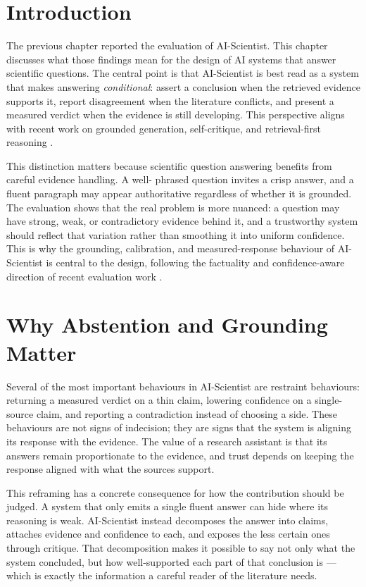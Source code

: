 \section{Introduction }

The previous chapter reported the evaluation of AI-Scientist. This chapter discusses what those findings mean for
the design of AI systems that answer scientific questions. The central point is that AI-Scientist is best read as a
system that makes answering \emph{conditional}: assert a conclusion when the retrieved evidence supports it, report
disagreement when the literature conflicts, and present a measured verdict when the evidence is still developing.
This perspective aligns with recent work on grounded generation, self-critique, and retrieval-first reasoning
\cite{lewis2020rag,shinn2023reflexion,asai2024selfrag}.

This distinction matters because scientific question answering benefits from careful evidence handling. A well-
phrased question invites a crisp answer, and a fluent paragraph may appear authoritative regardless of whether it
is grounded. The evaluation shows that the real problem is more nuanced: a question may have strong, weak, or
contradictory evidence behind it, and a trustworthy system should reflect that variation rather than smoothing it
into uniform confidence. This is why the grounding, calibration, and measured-response behaviour of AI-Scientist is
central to the design, following the factuality and confidence-aware direction of recent evaluation work
\cite{min2023factscore,kadavath2022language,lin2021truthfulqa}.

\section{Why Abstention and Grounding Matter }

Several of the most important behaviours in AI-Scientist are restraint behaviours: returning a measured verdict on
a thin claim, lowering confidence on a single-source claim, and reporting a contradiction instead of choosing a
side. These behaviours are not signs of indecision; they are signs that the system is aligning its response with
the evidence. The value of a research assistant is that its answers remain proportionate to the evidence, and trust
depends on keeping the response aligned with what the sources support.

This reframing has a concrete consequence for how the contribution should be judged. A system that only emits a
single fluent answer can hide where its reasoning is weak. AI-Scientist instead decomposes the answer into claims,
attaches evidence and confidence to each, and exposes the less certain ones through critique. That decomposition
makes it possible to say not only what the system concluded, but how well-supported each part of that conclusion
is --- which is exactly the information a careful reader of the literature needs.

